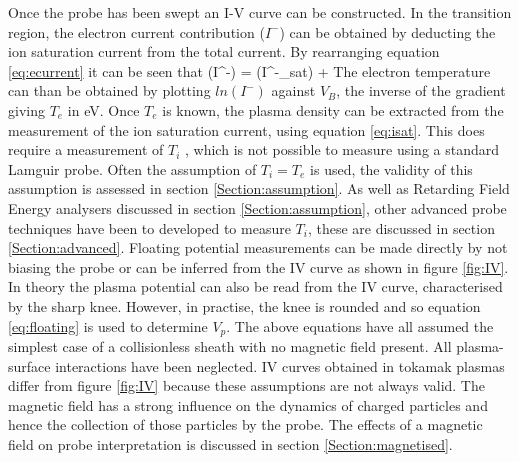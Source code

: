 Once the probe has been swept an I-V curve can be constructed. In the transition region, the electron current contribution ($I^-$) can be obtained by deducting the ion saturation current from the total current. By rearranging equation \ref{eq:ecurrent} it can be seen that 
\be
\ln(I^-) = \ln(I^-_{sat}) + 
\ee
The electron temperature can than be obtained by plotting $ln(I^-)$ against $V_B$, the inverse of the gradient giving $T_e$ in eV. Once $T_e$ is known, the plasma density can be extracted from the measurement of the ion saturation current, using equation \ref{eq:isat}. This does require a measurement of $T_i$ , which is not possible to measure using a standard Lamguir probe. Often the assumption of $T_i = T_e$ is used, the validity of this assumption is assessed in section \ref{Section:assumption}. As well as Retarding Field Energy analysers discussed in section \ref{Section:assumption}, other advanced probe techniques have been to developed to measure $T_i$, these are discussed in section \ref{Section:advanced}.
Floating potential measurements can be made directly by not biasing the probe or can be inferred from the IV curve as shown in figure \ref{fig:IV}. In theory the plasma potential can also be read from the IV curve, characterised by the sharp knee. However, in practise, the knee is rounded and so equation \ref{eq:floating} is used to determine $V_p$.
The above equations have all assumed the simplest case of a collisionless sheath with no magnetic field present. All plasma-surface interactions have been neglected. IV curves obtained in tokamak plasmas differ from figure \ref{fig:IV} because these assumptions are not always valid. The magnetic field has a strong influence on the dynamics of charged particles and hence the collection of those particles by the probe. The effects of a magnetic field on probe interpretation is discussed in section \ref{Section:magnetised}. %
